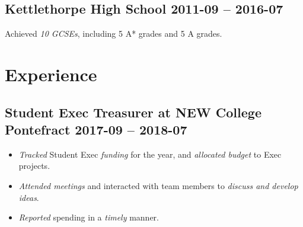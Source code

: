 \documentclass[cv.tex]{subfiles}
\begin{document}
    \subsection{Kettlethorpe High School
       \hfill 2011-09 -- 2016-07}
       Achieved \emph{10 GCSEs}, including 5 A* grades and 5 A
       grades\footnotemark[2].
\section{Experience}
    \subsection{Student Exec Treasurer at NEW College Pontefract
    \hfill 2017-09 -- 2018-07}
        \begin{itemize}
            \item \emph{Tracked} Student Exec \emph{funding} for the year,
                and \emph{allocated budget} to Exec projects.
            \item \emph{Attended
                meetings} and interacted with team members to
                \emph{discuss and develop ideas}.
            \item \emph{Reported} spending in a \emph{timely} manner.
        \end{itemize}
\end{document}
